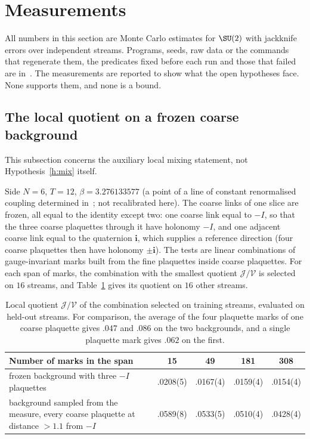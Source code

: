 \section{Measurements}\label{s:evid}
All numbers in this section are Monte Carlo estimates for $\SU(2)$ with jackknife errors over independent
streams. Programs, seeds, raw data or the commands that regenerate them, the predicates fixed before each
run and those that failed are in~\cite{RepoData}. The measurements are reported to show what the open
hypotheses face. None supports them, and none is a bound.

\subsection{The local quotient on a frozen coarse background}\label{s:local}
This subsection concerns the auxiliary local mixing statement, not Hypothesis~\ref{h:mix} itself.

Side $N=6$, $T=12$, $\beta=3.276133577$ (a point of a line of constant renormalised coupling determined
in~\cite{RepoData}; not recalibrated here). The coarse links of one slice are frozen, all equal to the
identity except two: one coarse link equal to $-I$, so that the three coarse plaquettes through it have
holonomy $-I$, and one adjacent coarse link equal to the quaternion $\mathbf i$, which supplies a reference
direction (four coarse plaquettes then have holonomy $\pm\mathbf i$). The tests are linear combinations of
gauge-invariant marks built from the fine plaquettes inside coarse plaquettes. For each span of marks, the
combination with the smallest quotient $\mathcal J/\mathcal V$ is selected on $16$ streams, and
Table~\ref{tab:local} gives its quotient on $16$ other streams.

\begin{table}[ht]
\centering\small
\begin{tabular}{@{}p{}cccc@{}}
\toprule
Number of marks in the span & 15 & 49 & 181 & 308 \\
\midrule
frozen background with three $-I$ plaquettes & .0208(5) & .0167(4) & .0159(4) & .0154(4) \\
background sampled from the measure, every coarse plaquette at distance $>1.1$ from $-I$ & .0589(8) & .0533(5) & .0510(4) & .0428(4) \\
\bottomrule
\end{tabular}
\caption{Local quotient $\mathcal J/\mathcal V$ of the combination selected on training streams, evaluated on
held-out streams. For comparison, the average of the four plaquette marks of one coarse plaquette gives
$.047$ and $.086$ on the two backgrounds, and a single plaquette mark gives $.062$ on the first.}
\label{tab:local}
\end{table}

